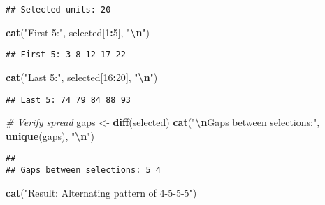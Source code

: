 \documentclass[
]{article}
\newenvironment{Shaded}{\begin{snugshade}}{\end{snugshade}}
\newcommand{\CommentTok}[1]{\textcolor[rgb]{0.56,0.35,0.01}{\textit{#1}}}
\newcommand{\DecValTok}[1]{\textcolor[rgb]{0.00,0.00,0.81}{#1}}
\newcommand{\FunctionTok}[1]{\textcolor[rgb]{0.13,0.29,0.53}{\textbf{#1}}}
\newcommand{\NormalTok}[1]{#1}
\newcommand{\OtherTok}[1]{\textcolor[rgb]{0.56,0.35,0.01}{#1}}
\newcommand{\SpecialCharTok}[1]{\textcolor[rgb]{0.81,0.36,0.00}{\textbf{#1}}}
\newcommand{\StringTok}[1]{\textcolor[rgb]{0.31,0.60,0.02}{#1}}
\begin{document}
\begin{verbatim}
## Selected units: 20
\end{verbatim}

\begin{Shaded}
\begin{Highlighting}[]
\FunctionTok{cat}\NormalTok{(}\StringTok{"First 5:"}\NormalTok{, selected[}\DecValTok{1}\SpecialCharTok{:}\DecValTok{5}\NormalTok{], }\StringTok{"}\SpecialCharTok{\textbackslash{}n}\StringTok{"}\NormalTok{)}
\end{Highlighting}
\end{Shaded}

\begin{verbatim}
## First 5: 3 8 12 17 22
\end{verbatim}

\begin{Shaded}
\begin{Highlighting}[]
\FunctionTok{cat}\NormalTok{(}\StringTok{"Last 5:"}\NormalTok{, selected[}\DecValTok{16}\SpecialCharTok{:}\DecValTok{20}\NormalTok{], }\StringTok{"}\SpecialCharTok{\textbackslash{}n}\StringTok{"}\NormalTok{)}
\end{Highlighting}
\end{Shaded}

\begin{verbatim}
## Last 5: 74 79 84 88 93
\end{verbatim}

\begin{Shaded}
\begin{Highlighting}[]
\CommentTok{\# Verify spread}
\NormalTok{gaps }\OtherTok{\textless{}{-}} \FunctionTok{diff}\NormalTok{(selected)}
\FunctionTok{cat}\NormalTok{(}\StringTok{"}\SpecialCharTok{\textbackslash{}n}\StringTok{Gaps between selections:"}\NormalTok{, }\FunctionTok{unique}\NormalTok{(gaps), }\StringTok{"}\SpecialCharTok{\textbackslash{}n}\StringTok{"}\NormalTok{)}
\end{Highlighting}
\end{Shaded}

\begin{verbatim}
## 
## Gaps between selections: 5 4
\end{verbatim}

\begin{Shaded}
\begin{Highlighting}[]
\FunctionTok{cat}\NormalTok{(}\StringTok{"Result: Alternating pattern of 4{-}5{-}5{-}5"}\NormalTok{)}
\end{Highlighting}
\end{Shaded}
\end{document}
